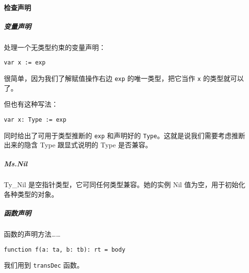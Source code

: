 \documentclass[
]{article}
\begin{document}
\hypertarget{header-n56}{%
\paragraph{检查声明}\label{header-n56}}

\hypertarget{header-n57}{%
\subparagraph{变量声明}\label{header-n57}}

处理一个无类型约束的变量声明：

\begin{verbatim}
var x := exp
\end{verbatim}

很简单，因为我们了解赋值操作右边 \texttt{exp} 的唯一类型，把它当作
\texttt{x} 的类型就可以了。

但也有这种写法：

\begin{verbatim}
var x: Type := exp
\end{verbatim}

同时给出了可用于类型推断的 \texttt{exp} 和声明好的
\texttt{Type}。这就是说我们需要考虑推断出来的隐含 Type 跟显式说明的 Type
是否兼容。

\hypertarget{header-n64}{%
\subparagraph{Ms.Nil}\label{header-n64}}

Ty\_Nil 是空指针类型，它可同任何类型兼容。她的实例 Nil
值为空，用于初始化各种类型的对象。

\hypertarget{header-n66}{%
\subparagraph{函数声明}\label{header-n66}}

函数的声明方法\ldots\ldots{}

\begin{verbatim}
function f(a: ta, b: tb): rt = body
\end{verbatim}

我们用到 \texttt{transDec} 函数。
\end{document}
